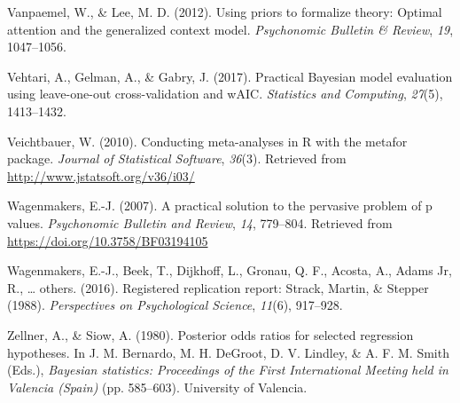 \documentclass[english,man]{apa6}
\theoremstyle{definition}
\theoremstyle{definition}
\theoremstyle{definition}
\theoremstyle{remark}
\begin{document}
\hypertarget{ref-Vanpaemel:Lee:2012}{}
Vanpaemel, W., \& Lee, M. D. (2012). Using priors to formalize theory:
Optimal attention and the generalized context model. \emph{Psychonomic
Bulletin \& Review}, \emph{19}, 1047--1056.

\hypertarget{ref-Vehtari:etal:2017}{}
Vehtari, A., Gelman, A., \& Gabry, J. (2017). Practical Bayesian model
evaluation using leave-one-out cross-validation and wAIC.
\emph{Statistics and Computing}, \emph{27}(5), 1413--1432.

\hypertarget{ref-Veichtbauer:2010}{}
Veichtbauer, W. (2010). Conducting meta-analyses in R with the metafor
package. \emph{Journal of Statistical Software}, \emph{36}(3). Retrieved
from \url{http://www.jstatsoft.org/v36/i03/}

\hypertarget{ref-Wagenmakers:2007}{}
Wagenmakers, E.-J. (2007). A practical solution to the pervasive problem
of p values. \emph{Psychonomic Bulletin and Review}, \emph{14},
779--804. Retrieved from \url{https://doi.org/10.3758/BF03194105}

\hypertarget{ref-Wagenmakers:etal:2016}{}
Wagenmakers, E.-J., Beek, T., Dijkhoff, L., Gronau, Q. F., Acosta, A.,
Adams Jr, R., \ldots{} others. (2016). Registered replication report:
Strack, Martin, \& Stepper (1988). \emph{Perspectives on Psychological
Science}, \emph{11}(6), 917--928.

\hypertarget{ref-Zellner:Siow:1980}{}
Zellner, A., \& Siow, A. (1980). Posterior odds ratios for selected
regression hypotheses. In J. M. Bernardo, M. H. DeGroot, D. V. Lindley,
\& A. F. M. Smith (Eds.), \emph{Bayesian statistics: Proceedings of the
First International Meeting held in Valencia (Spain)} (pp. 585--603).
University of Valencia.
\end{document}
